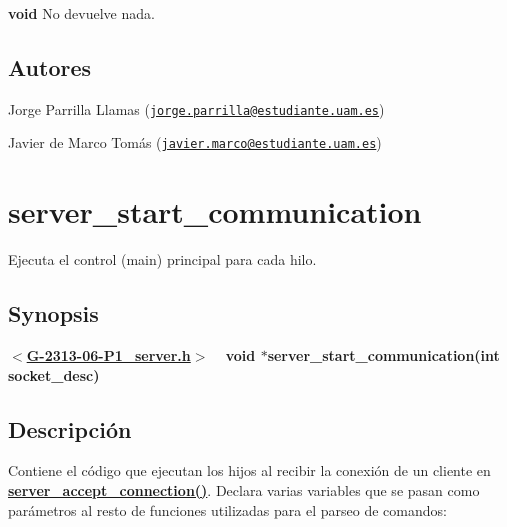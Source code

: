 \begin{DoxyItemize}
\item {\bfseries void} No devuelve nada. 
\end{DoxyItemize}\hypertarget{server_accept_connection_authors3}{}\subsection{Autores}\label{server_accept_connection_authors3}

\begin{DoxyItemize}
\item Jorge Parrilla Llamas (\href{mailto:jorge.parrilla@estudiante.uam.es}{\tt jorge.\+parrilla@estudiante.\+uam.\+es}) 
\item Javier de Marco Tomás (\href{mailto:javier.marco@estudiante.uam.es}{\tt javier.\+marco@estudiante.\+uam.\+es}) 
\end{DoxyItemize}\hypertarget{server_start_communication}{}\section{server\+\_\+start\+\_\+communication}\label{server_start_communication}
Ejecuta el control (main) principal para cada hilo.\hypertarget{server_start_communication_synopsis4}{}\subsection{Synopsis}\label{server_start_communication_synopsis4}
{ {\bfseries $<$\hyperlink{G-2313-06-P1__server_8h}{G-\/2313-\/06-\/\+P1\+\_\+server.\+h}$>$} ~\newline
 {\bfseries void $\ast$server\+\_\+start\+\_\+communication(int socket\+\_\+desc)} } \hypertarget{server_start_communication_descripcion4}{}\subsection{Descripción}\label{server_start_communication_descripcion4}
Contiene el código que ejecutan los hijos al recibir la conexión de un cliente en {\bfseries \hyperlink{G-2313-06-P1__server_8c_aaac8642d2e699e0f9d942d28a9b233c2}{server\+\_\+accept\+\_\+connection()}}. Declara varias variables que se pasan como parámetros al resto de funciones utilizadas para el parseo de comandos\+:


